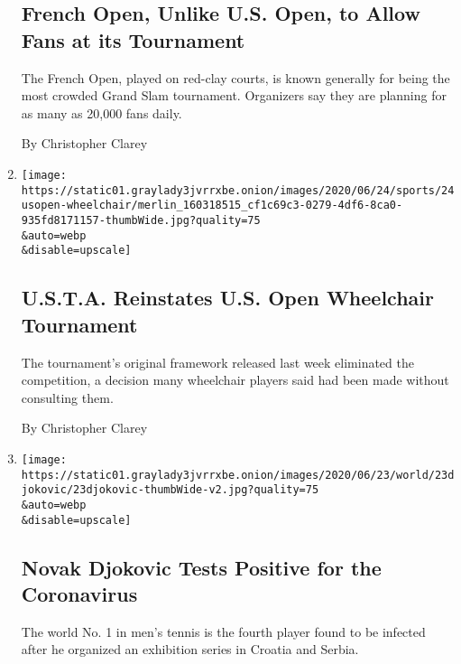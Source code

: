 \begin{enumerate}
  \hypertarget{french-open-unlike-us-open-to-allow-fans-at-its-tournament}{%
  \subsection{French Open, Unlike U.S. Open, to Allow Fans at its
  Tournament}\label{french-open-unlike-us-open-to-allow-fans-at-its-tournament}}

  The French Open, played on red-clay courts, is known generally for
  being the most crowded Grand Slam tournament. Organizers say they are
  planning for as many as 20,000 fans daily.

  By Christopher Clarey
\item
  \href{/2020/06/25/sports/tennis/us-open-wheelchair-tournament.html}{}

  \texttt{[image: https://static01.graylady3jvrrxbe.onion/images/2020/06/24/sports/24usopen-wheelchair/merlin\_160318515\_cf1c69c3-0279-4df6-8ca0-935fd8171157-thumbWide.jpg?quality=75\\\&auto=webp\\\&disable=upscale]}

  \hypertarget{usta-reinstates-us-open-wheelchair-tournament}{%
  \subsection{U.S.T.A. Reinstates U.S. Open Wheelchair
  Tournament}\label{usta-reinstates-us-open-wheelchair-tournament}}

  The tournament's original framework released last week eliminated the
  competition, a decision many wheelchair players said had been made
  without consulting them.

  By Christopher Clarey
\item
  \href{/2020/06/23/sports/tennis/novak-djokovic-coronavirus.html}{}

  \texttt{[image: https://static01.graylady3jvrrxbe.onion/images/2020/06/23/world/23djokovic/23djokovic-thumbWide-v2.jpg?quality=75\\\&auto=webp\\\&disable=upscale]}

  \hypertarget{novak-djokovic-tests-positive-for-the-coronavirus}{%
  \subsection{Novak Djokovic Tests Positive for the
  Coronavirus}\label{novak-djokovic-tests-positive-for-the-coronavirus}}

  The world No. 1 in men's tennis is the fourth player found to be
  infected after he organized an exhibition series in Croatia and
  Serbia.


\end{enumerate}
